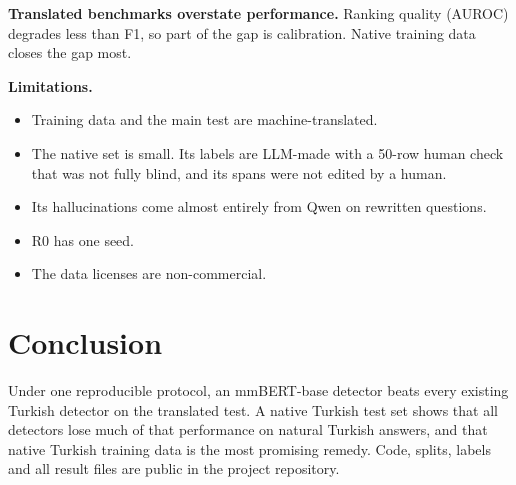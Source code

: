 \documentclass[conference,a4paper]{IEEEtran}
\begin{document}
\textbf{Translated benchmarks overstate performance.} Ranking quality (AUROC) degrades less than F1, so part of the gap is calibration. Native training data closes the gap most.

\textbf{Limitations.}
\begin{itemize}
\item Training data and the main test are machine-translated.
\item The native set is small. Its labels are LLM-made with a 50-row human check that was not fully blind, and its spans were not edited by a human.
\item Its hallucinations come almost entirely from Qwen on rewritten questions.
\item R0 has one seed.
\item The data licenses are non-commercial.
\end{itemize}

\section{Conclusion}
Under one reproducible protocol, an mmBERT-base detector beats every existing Turkish detector on the translated test. A native Turkish test set shows that all detectors lose much of that performance on natural Turkish answers, and that native Turkish training data is the most promising remedy. Code, splits, labels and all result files are public in the project repository.
\end{document}
